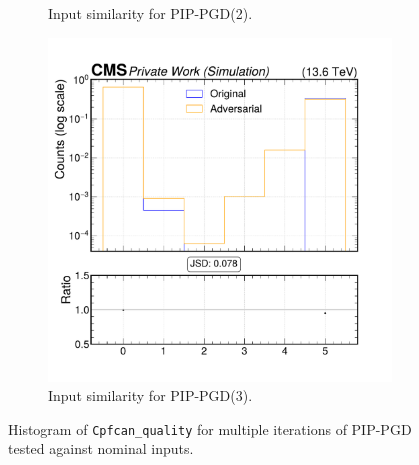 \begin{figure}[htbp]
\begin{subfigure}[t]{0.32\textwidth}
    \caption*{Input similarity for PIP-PGD(2).}
  \end{subfigure}\hfill
  \begin{subfigure}[t]{0.32\textwidth}
    \includegraphics[width=\linewidth]{media/output/features/compare/combined_it_3/cmp_cpf_arr_Cpfcan_quality.pdf}
    \caption*{Input similarity for PIP-PGD(3).}
  \end{subfigure}

  \caption*{Histogram of \texttt{Cpfcan\_quality} for multiple iterations of PIP-PGD tested against nominal inputs.}
  \label{fig:combined_input_Cpfcan_quality}
\end{figure}

